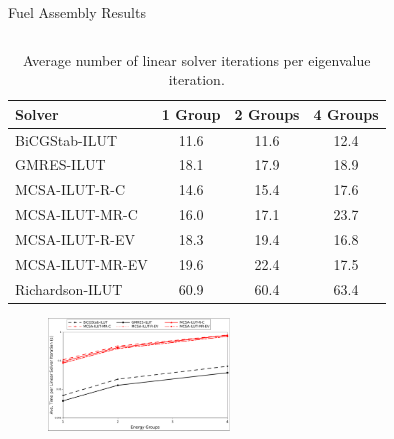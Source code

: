 \documentclass{beamer}
\begin{document}
\begin{frame}{Fuel Assembly Results}

  \begin{columns}

    \begin{column}{0.5\textwidth}

      {\tiny
      \begin{table}[h!]
        \begin{center}
          \begin{tabular}{lccc}\hline\hline
            \multicolumn{1}{l}{Solver}&
            \multicolumn{1}{c}{1 Group}&
            \multicolumn{1}{c}{2 Groups}&
            \multicolumn{1}{c}{4 Groups}\\
            \hline
            BiCGStab-ILUT & 11.6 & 11.6 & 12.4 \\ 
            GMRES-ILUT & 18.1 & 17.9 & 18.9 \\
            MCSA-ILUT-R-C & 14.6 & 15.4 & 17.6 \\
            MCSA-ILUT-MR-C & 16.0 & 17.1 & 23.7 \\
            MCSA-ILUT-R-EV & 18.3 & 19.4 & 16.8 \\
            MCSA-ILUT-MR-EV & 19.6 & 22.4 & 17.5 \\
            Richardson-ILUT & 60.9 & 60.4 & 63.4 \\
            \hline\hline
          \end{tabular}
        \end{center}
        \caption{ Average number of linear solver iterations per
          eigenvalue iteration.}
      \end{table}
      }

      \begin{figure}[htpb!]
        \begin{center}
          \includegraphics[width=1.9in]{solver_time.pdf}
        \end{center}
      \end{figure}

    \end{column}


\end{columns}
\end{frame}
\end{document}
